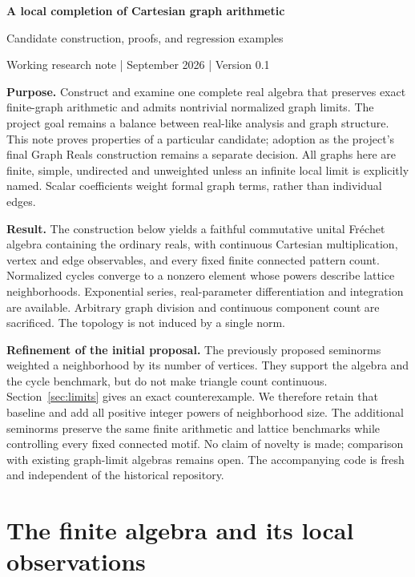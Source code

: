 \documentclass[11pt]{article}
\theoremstyle{definition}\newtheorem{definition}[theorem]{Definition}
\begin{document}
\begin{center}
{\LARGE\bfseries A local completion of Cartesian graph arithmetic}\par
\vspace{0.35em}
{\large Candidate construction, proofs, and regression examples}\par
\vspace{0.3em}
Working research note \;| September 2026 \;|\; Version 0.1
\end{center}

\textbf{Purpose.} Construct and examine one complete real algebra that preserves exact finite-graph arithmetic and admits nontrivial normalized graph limits. The project goal remains a balance between real-like analysis and graph structure. This note proves properties of a particular candidate; adoption as the project's final Graph Reals construction remains a separate decision. All graphs here are finite, simple, undirected and unweighted unless an infinite local limit is explicitly named. Scalar coefficients weight formal graph terms, rather than individual edges.

\textbf{Result.} The construction below yields a faithful commutative unital Fr\'echet algebra containing the ordinary reals, with continuous Cartesian multiplication, vertex and edge observables, and every fixed finite connected pattern count. Normalized cycles converge to a nonzero element whose powers describe lattice neighborhoods. Exponential series, real-parameter differentiation and integration are available. Arbitrary graph division and continuous component count are sacrificed. The topology is not induced by a single norm.

\textbf{Refinement of the initial proposal.} The previously proposed seminorms weighted a neighborhood by its number of vertices. They support the algebra and the cycle benchmark, but do not make triangle count continuous. Section~\ref{sec:limits} gives an exact counterexample. We therefore retain that baseline and add all positive integer powers of neighborhood size. The additional seminorms preserve the same finite arithmetic and lattice benchmarks while controlling every fixed connected motif. No claim of novelty is made; comparison with existing graph-limit algebras remains open. The accompanying code is fresh and independent of the historical repository.

\section{The finite algebra and its local observations}
\end{document}
